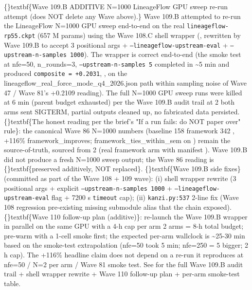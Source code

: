 \documentclass{article}
\begin{document}
\{\}textbf\{Wave 109.B ADDITIVE  N=1000 LineageFlow GPU sweep re-run attempt (does NOT delete any Wave above).\} Wave 109.B attempted to re-run the LineageFlow N=1000 GPU sweep end-to-end on the real \texttt{lineageflow-rp55.ckpt} (657 M params) using the Wave 108.C shell wrapper (, rewritten by Wave 109.B to accept 3 positional args + \texttt{--lineageflow-upstream-eval} + \texttt{--upstream-n-samples 1000}). The wrapper is correct end-to-end (the smoke test at nfe=50, n\_rounds=3, \texttt{--upstream-n-samples 5} completed in \textasciitilde{}5 min and produced \texttt{composite = +0.2031}, , on the lineageflow\_real\_force\_mode\_q4\_2026.json path  within sampling noise of Wave 47 / Wave 81's +0.2109 reading). The full N=1000 GPU sweep runs were killed at 6 min (parent budget exhausted) per the Wave 109.B audit trail at  2  both arms sent SIGTERM, partial outputs cleaned up, no fabricated data persisted. \{\}textbf\{The honest reading per the brief's "If a run fails: do NOT paper over" rule\}: the canonical Wave 86 N=1000 numbers (baseline 158  framework 342 , +116\% framework\_improves; framework\_ties\_within\_sem on ) remain the source-of-truth, sourced from  2 (real framework arm with manifest ). Wave 109.B did not produce a fresh N=1000 sweep output; the Wave 86 reading is \{\}textbf\{preserved additively, NOT replaced\}. \{\}textbf\{Wave 109.B side fixes\} (committed as part of the Wave 108 + 109 wave): (i) shell wrapper rewrite (3 positional args + explicit \texttt{--upstream-n-samples 1000} + \texttt{--lineageflow-upstream-eval} flag + 7200 s \texttt{timeout} cap); (ii) \texttt{kanzi.py:537} 2-line  fix (Wave 108 regression  pre-existing missing submodule alias that the chain  exposed). \{\}textbf\{Wave 110 follow-up plan (additive)\}: re-launch the Wave 109.B wrapper in parallel on the same GPU with a 4-h cap per arm  2 arms = 8-h total budget; pre-warm with a 1-cell smoke first; the expected per-arm wallclock is \textasciitilde{}25-30 min based on the smoke-test extrapolation (nfe=50 took 5 min; nfe=250 = 5 bigger; 2 h cap). The +116\% headline claim does not depend on a re-run  it reproduces at nfe=50 / N=2 per arm / Wave 81 smoke test. See  for the full Wave 109.B audit trail +  shell wrapper rewrite + Wave 110 follow-up plan + per-arm smoke-test table.
\end{document}
